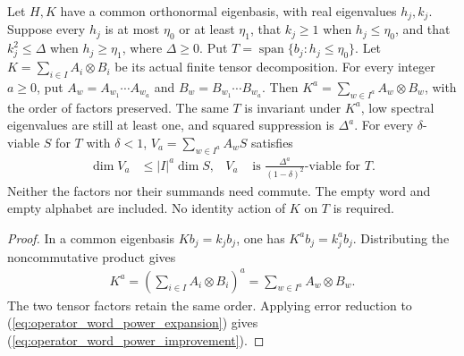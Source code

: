 \begin{lemma}
    \label{thm:spectral_operator_word_powers}
    \leanok
    Let $H,K$ have a common orthonormal eigenbasis, with real eigenvalues
    $h_j,k_j$. Suppose every $h_j$ is at most $\eta_0$ or at least
    $\eta_1$, that $k_j\ge1$ when $h_j\le\eta_0$, and that
    $k_j^2\le\Delta$ when $h_j\ge\eta_1$, where $\Delta\ge0$.
    Put $T=\operatorname{span}\{b_j:h_j\le\eta_0\}$. Let
    $K=\sum_{i\in I}A_i\otimes B_i$ be its actual finite tensor decomposition. For every integer $a\ge0$, put
    $A_w=A_{w_1}\cdots A_{w_a}$ and $B_w=B_{w_1}\cdots B_{w_a}$.
    Then $K^a=\sum_{w\in I^a}A_w\otimes B_w$, with the order of factors
    preserved. The same $T$ is invariant under $K^a$, low spectral
    eigenvalues are still at least one, and squared suppression is
    $\Delta^a$. For every $\delta$-viable $S$ for $T$ with $\delta<1$,
    $V_a=\sum_{w\in I^a}A_wS$ satisfies
    \begin{align}
        \dim V_a & \le |I|^a\dim S,                                              &
        V_a      & \text{ is }\frac{\Delta^a}{(1-\delta)^2}\text{-viable for }T.
        \label{eq:operator_word_power_improvement}
    \end{align}
    Neither the factors nor their summands need commute. The empty word
    and empty alphabet are included. No identity action of $K$ on $T$
    is required.
\end{lemma}
\begin{proof}\leanok
    In a common eigenbasis $Kb_j=k_jb_j$, one has $K^ab_j=k_j^ab_j$.
    Distributing the noncommutative product gives
    \begin{align}
        K^a=\left(\sum_{i\in I}A_i\otimes B_i\right)^a
        =\sum_{w\in I^a}A_w\otimes B_w.
        \label{eq:operator_word_power_expansion}
    \end{align}
    The two tensor factors retain the same order. Applying error reduction
    to (\ref{eq:operator_word_power_expansion}) gives
    (\ref{eq:operator_word_power_improvement}).
\end{proof}

